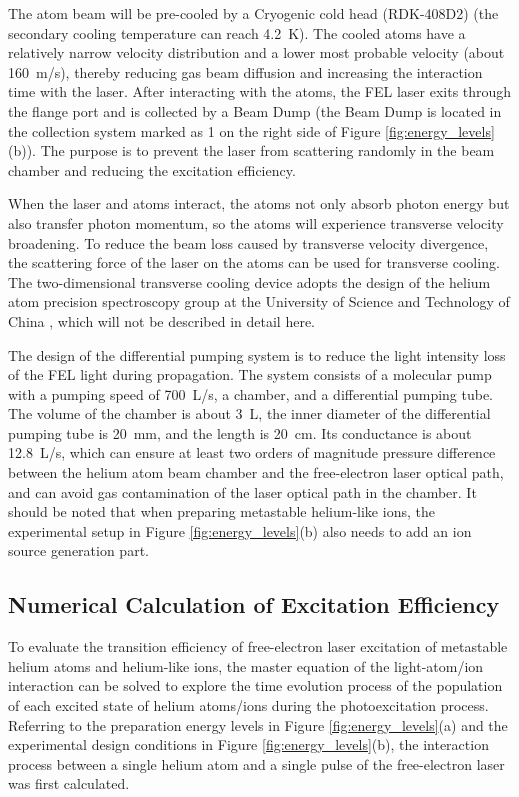 \documentclass[12pt,a4paper]{article}
\begin{document}
The atom beam will be pre-cooled by a Cryogenic cold head (RDK-408D2) (the secondary cooling temperature can reach \SI{4.2}{K}). The cooled atoms have a relatively narrow velocity distribution and a lower most probable velocity (about \SI{160}{m/s}), thereby reducing gas beam diffusion and increasing the interaction time with the laser. After interacting with the atoms, the FEL laser exits through the flange port and is collected by a Beam Dump (the Beam Dump is located in the collection system marked as 1 on the right side of Figure \ref{fig:energy_levels}(b)). The purpose is to prevent the laser from scattering randomly in the beam chamber and reducing the excitation efficiency.

When the laser and atoms interact, the atoms not only absorb photon energy but also transfer photon momentum, so the atoms will experience transverse velocity broadening. To reduce the beam loss caused by transverse velocity divergence, the scattering force of the laser on the atoms can be used for transverse cooling. The two-dimensional transverse cooling device adopts the design of the helium atom precision spectroscopy group at the University of Science and Technology of China \cite{ref20}, which will not be described in detail here.

The design of the differential pumping system is to reduce the light intensity loss of the FEL light during propagation. The system consists of a molecular pump with a pumping speed of \SI{700}{L/s}, a chamber, and a differential pumping tube. The volume of the chamber is about \SI{3}{L}, the inner diameter of the differential pumping tube is \SI{20}{mm}, and the length is \SI{20}{cm}. Its conductance is about \SI{12.8}{L/s}, which can ensure at least two orders of magnitude pressure difference between the helium atom beam chamber and the free-electron laser optical path, and can avoid gas contamination of the laser optical path in the chamber. It should be noted that when preparing metastable helium-like ions, the experimental setup in Figure \ref{fig:energy_levels}(b) also needs to add an ion source generation part.

\subsection{Numerical Calculation of Excitation Efficiency}

To evaluate the transition efficiency of free-electron laser excitation of metastable helium atoms and helium-like ions, the master equation of the light-atom/ion interaction can be solved to explore the time evolution process of the population of each excited state of helium atoms/ions during the photoexcitation process. Referring to the preparation energy levels in Figure \ref{fig:energy_levels}(a) and the experimental design conditions in Figure \ref{fig:energy_levels}(b), the interaction process between a single helium atom and a single pulse of the free-electron laser was first calculated.
\end{document}
